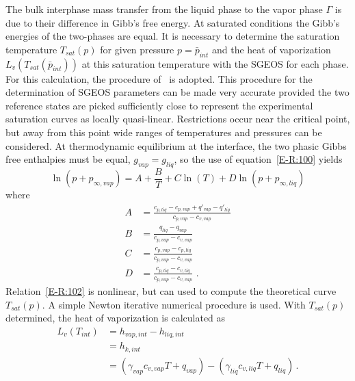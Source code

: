 The bulk interphase mass transfer from the liquid phase to the vapor
phase $\Gamma$ is due to their difference in Gibb's free energy.  At
saturated conditions the Gibb's energies of the two-phases are equal.
It is necessary to determine the saturation temperature $T_{sat}(p)$
for given pressure $p=\bar{p}_{int}$ and the heat of vaporization
$L_v\left(T_{sat}(\bar{p}_{int}) \right)$ at this saturation temperature
with the SGEOS for each phase.  For this calculation, the procedure
of~\cite{SGEOS} is adopted.  This procedure for the
determination of SGEOS parameters can be made very accurate provided
the two reference states are picked sufficiently close to represent
the experimental saturation curves as locally quasi-linear.
Restrictions occur near the critical point, but away from this point
wide ranges of temperatures and pressures can be considered.  At
thermodynamic equilibrium at the interface, the two phasic Gibbs free
enthalpies must be equal, $g_{vap}=g_{liq}$, so the use of equation~\eqref{E-R:100}
yields
\begin{equation}
  \label{E-R:102}
  \ln \left( p + p_{\infty,  vap} \right) = A + \frac{B}{T} + C  \ln(T) + D  \ln \left( p + p_{\infty,  liq} \right)
\end{equation}
where
\begin{align}
  A &= \frac{c_{p, liq} - c_{p, vap} + q'_{vap} - q'_{liq}}{c_{p,  vap} - c_{v,  vap}} \\
  B &= \frac{q_{liq}-q_{vap}}{c_{p,  vap} - c_{v,  vap}} \\
  C &= \frac{c_{p, vap} - c_{p, liq}}{c_{p,  vap} - c_{v,  vap}} \\
  D &= \frac{c_{p, liq} - c_{v, liq}}{c_{p,  vap} - c_{v,  vap}} \,\,.
\end{align}
Relation~\eqref{E-R:102} is nonlinear, but can used to compute the
theoretical curve $T_{sat}(p)$.  A simple Newton iterative numerical
procedure is used.  With $T_{sat}(p)$ determined, the heat of
vaporization is calculated as
\begin{align}
  \nonumber
  L_v \left( T_{int} \right) &= h_{vap,  int} - h_{liq,  int}
  \\
  \nonumber
  &= h_{k,  int}
  \\
  &= \left( \gamma_{vap}  c_{v, vap}  T + q_{vap} \right) - \left( \gamma_{liq}  c_{v, liq}  T + q_{liq} \right) \,.
\end{align}
%
